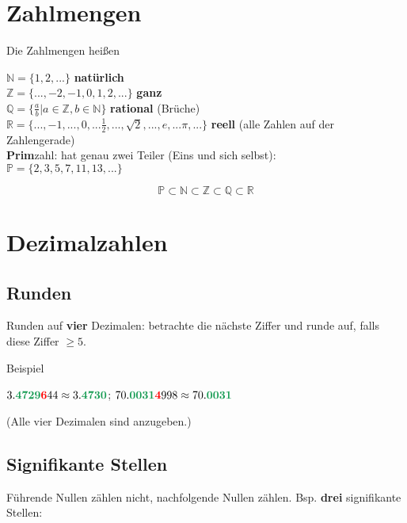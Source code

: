 \begin{multicols}{2}%

\section*{Zahlmengen}
\begin{definition*}{}{}
Die Zahlmengen heißen

$\mathbb{N} = \{1,2, ...\}$                                   \textbf{natürlich}\\
$\mathbb{Z} = \{..., -2, -1, 0, 1,2, ...\}$                   \textbf{ganz}\\
$\mathbb{Q} = \{\frac{a}b|a\in \mathbb{Z},b\in\mathbb{N}\}$   \textbf{rational} (Brüche)\\
$\mathbb{R} = \{..., -1, ..., 0, ... \frac12, ..., \sqrt{2}, ..., e, ... \pi, ...\}  $ \textbf{reell} (alle Zahlen auf der Zahlengerade)\\

\textbf{Prim}zahl: hat genau zwei Teiler (Eins und sich selbst):\\ $\mathbb{P} = \{2, 3, 5, 7, 11, 13, ...\}$
\end{definition*}

$$\mathbb{P} \subset \mathbb{N} \subset \mathbb{Z} \subset \mathbb{Q} \subset \mathbb{R}$$


\hrulefill%

\section*{Dezimalzahlen}
\subsection*{Runden}
Runden auf \textbf{\color{ForestGreen}vier}  Dezimalen: betrachte die nächste Ziffer und runde auf, falls diese {\color{red}Ziffer} $\ge 5$.

Beispiel

$3.\textbf{\color{ForestGreen}4729}\textbf{\color{red}6}44 \approx
3.\textbf{\color{ForestGreen}4730}$; \hfill{ }
$70.\textbf{\color{ForestGreen}0031}\textbf{\color{red}4}998\approx
70.\textbf{\color{ForestGreen}0031}$

(Alle vier Dezimalen sind anzugeben.)

\subsection*{Signifikante Stellen}
Führende Nullen zählen nicht, nachfolgende Nullen
zählen. Bsp. \textbf{\color{ForestGreen}drei} signifikante Stellen:


\end{multicols}
